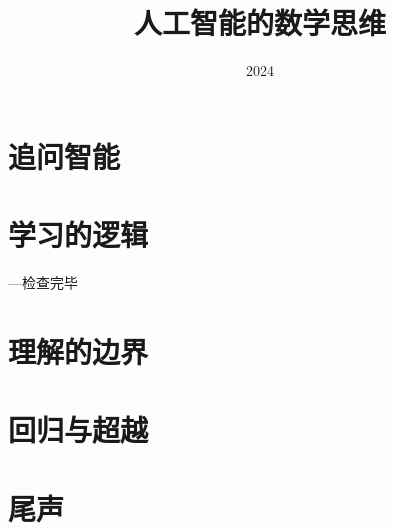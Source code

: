 \documentclass[lang=cn,scheme=chinese,12pt]{elegantbook}
\title{人工智能的数学思维}
\institute{华东师范大学 软件工程学院}
\date{2024}
\begin{document}
\maketitle

%

\frontmatter

\tableofcontents

\mainmatter

\part{追问智能}


\part{学习的逻辑}

 ---检查完毕 %
%

\part{理解的边界}

\part{回归与超越}


% 

\part{尾声}



%



\end{document}
